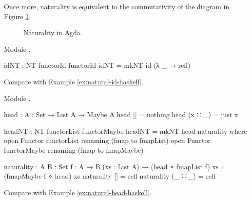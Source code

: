 Once more, naturality is equivalent to the commutativity of the
diagram in Figure \ref{fig:naturality-agda}.
\begin{figure}[htb]
  \begin{center}
  \end{center}
  \caption{Naturality in Agda.}
  \label{fig:naturality-agda}
\end{figure}

\begin{example}
  [Identity]

  Module .
  \begin{codeagda}
    idNT : NT functorId functorId
    idNT = mkNT id (λ _ → refl)
  \end{codeagda}

  Compare with Example \ref{ex:natural-id-haskell}.

\end{example}

\begin{example}

  \label{ex:natural-head-agda}

  Module .

  \begin{codeagda}
    head : {A : Set} → List A → Maybe A
    head []      = nothing
    head (x ∷ _) = just x
  \end{codeagda}
  \begin{codeagda}
    headNT : NT functorList functorMaybe
    headNT = mkNT head naturality
      where
        open Functor functorList renaming (fmap to fmapList)
        open Functor functorMaybe renaming (fmap to fmapMaybe)

        naturality : {A B : Set} {f : A → B} (xs : List A) →
                     (head ∘ fmapList f) xs ≡ (fmapMaybe f ∘ head) xs
        naturality []      = refl
        naturality (_ ∷ _) = refl
  \end{codeagda}

  Compare with Example \ref{ex:natural-head-haskell}.

\end{example}

